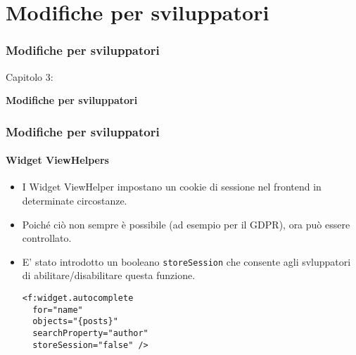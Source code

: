 %

\section{Modifiche per sviluppatori}
\begin{frame}[fragile]
	\frametitle{Modifiche per sviluppatori}

	\begin{center}\huge{Capitolo 3:}\end{center}
	\begin{center}\huge{\color{typo3darkgrey}\textbf{Modifiche per sviluppatori}}\end{center}

\end{frame}


\begin{frame}[fragile]
	\frametitle{Modifiche per sviluppatori}
	\framesubtitle{Widget ViewHelpers}

	\lstset{basicstyle=\smaller\ttfamily}

	\begin{itemize}
		\item I Widget ViewHelper impostano un cookie di sessione nel frontend in determinate circostanze.
		\item Poiché ciò non sempre è possibile (ad esempio per il GDPR), ora può essere controllato.
		\item E' stato introdotto un booleano \texttt{storeSession} che consente agli svluppatori di abilitare/disabilitare questa funzione.
\begin{lstlisting}
<f:widget.autocomplete
  for="name"
  objects="{posts}"
  searchProperty="author"
  storeSession="false" />
\end{lstlisting}

	\end{itemize}

\end{frame}

